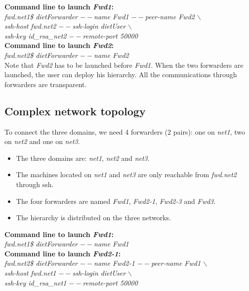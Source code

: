 \noindent\textbf{Command line to launch \textit{Fwd1}: }\\
{\small \it fwd.net1\$ dietForwarder {\tiny$--$}name Fwd1
  {\tiny$--$}peer-name Fwd2 $\backslash$\\
  \hspace*{4.2cm}{\tiny$--$}ssh-host fwd.net2 {\tiny$--$}ssh-login
  dietUser $\backslash$\\
  \hspace*{4.2cm}{\tiny$--$}ssh-key id\_rsa\_net2
  {\tiny$--$}remote-port 50000}\\[2mm]
\noindent\textbf{Command line to launch \textit{Fwd2}: }\\
{\small \it fwd.net2\$ dietForwarder {\tiny$--$}name Fwd2}\\[3mm]

Note that \textit{Fwd2} has to be launched before \textit{Fwd1}.
When the two forwarders are launched, the user can deploy his \diet
hierarchy. All the communications through  \diet forwarders are
transparent.

\subsection{Complex network topology}
To connect the three domains, we need 4 forwarders (2 pairs): one on
\textit{net1}, two on \textit{net2} and one on \textit{net3}.
\begin{itemize}
\item The three domains are: \textit{net1}, \textit{net2} and
  \textit{net3}.
\item The machines located on \textit{net1} and \textit{net3} are only
  reachable from \textit{fwd.net2} through ssh.
\item The four forwarders are named \textit{Fwd1}, \textit{Fwd2-1},
  \textit{Fwd2-3} and \textit{Fwd3}.
\item The \diet hierarchy is distributed on the three networks.\\
\end{itemize}

\noindent\textbf{Command line to launch \textit{Fwd1}: }\\
{\small \it fwd.net1\$ dietForwarder {\tiny$--$}name Fwd1}\\[2mm]

\noindent\textbf{Command line to launch \textit{Fwd2-1}: }\\
{\small \it fwd.net2\$ dietForwarder {\tiny$--$}name Fwd2-1
  {\tiny$--$}peer-name Fwd1 $\backslash$\\
  \hspace*{4.2cm}{\tiny$--$}ssh-host fwd.net1 {\tiny$--$}ssh-login
  dietUser $\backslash$\\
  \hspace*{4.2cm}{\tiny$--$}ssh-key id\_rsa\_net1
  {\tiny$--$}remote-port 50000}\\[2mm]

